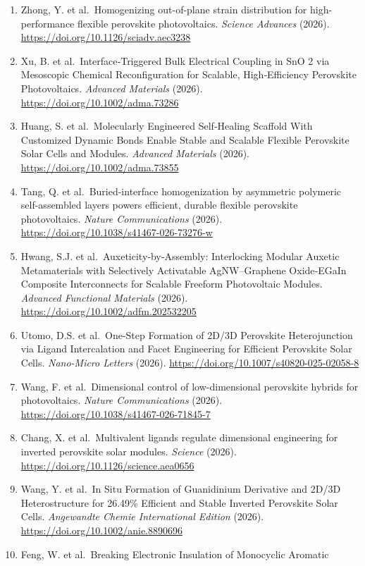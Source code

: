 \documentclass[
  11pt,
]{article}
\begin{document}
\begin{enumerate}
\item
  Zhong, Y. et al.~Homogenizing out-of-plane strain distribution for
  high-performance flexible perovskite photovoltaics. \emph{Science
  Advances} (2026). \url{https://doi.org/10.1126/sciadv.aec3238}
\item
  Xu, B. et al.~Interface‐Triggered Bulk Electrical Coupling in SnO 2
  via Mesoscopic Chemical Reconfiguration for Scalable, High‐Efficiency
  Perovskite Photovoltaics. \emph{Advanced Materials} (2026).
  \url{https://doi.org/10.1002/adma.73286}
\item
  Huang, S. et al.~Molecularly Engineered Self‐Healing Scaffold With
  Customized Dynamic Bonds Enable Stable and Scalable Flexible
  Perovskite Solar Cells and Modules. \emph{Advanced Materials} (2026).
  \url{https://doi.org/10.1002/adma.73855}
\item
  Tang, Q. et al.~Buried-interface homogenization by asymmetric
  polymeric self-assembled layers powers efficient, durable flexible
  perovskite photovoltaics. \emph{Nature Communications} (2026).
  \url{https://doi.org/10.1038/s41467-026-73276-w}
\item
  Hwang, S.J. et al.~Auxeticity‐by‐Assembly: Interlocking Modular
  Auxetic Metamaterials with Selectively Activatable AgNW--Graphene
  Oxide‐EGaIn Composite Interconnects for Scalable Freeform Photovoltaic
  Modules. \emph{Advanced Functional Materials} (2026).
  \url{https://doi.org/10.1002/adfm.202532205}
\item
  Utomo, D.S. et al.~One-Step Formation of 2D/3D Perovskite
  Heterojunction via Ligand Intercalation and Facet Engineering for
  Efficient Perovskite Solar Cells. \emph{Nano-Micro Letters} (2026).
  \url{https://doi.org/10.1007/s40820-025-02058-8}
\item
  Wang, F. et al.~Dimensional control of low-dimensional perovskite
  hybrids for photovoltaics. \emph{Nature Communications} (2026).
  \url{https://doi.org/10.1038/s41467-026-71845-7}
\item
  Chang, X. et al.~Multivalent ligands regulate dimensional engineering
  for inverted perovskite solar modules. \emph{Science} (2026).
  \url{https://doi.org/10.1126/science.aea0656}
\item
  Wang, Y. et al.~In Situ Formation of Guanidinium Derivative and 2D/3D
  Heterostructure for 26.49\% Efficient and Stable Inverted Perovskite
  Solar Cells. \emph{Angewandte Chemie International Edition} (2026).
  \url{https://doi.org/10.1002/anie.8890696}
\item
  Feng, W. et al.~Breaking Electronic Insulation of Monocyclic Aromatic

\end{enumerate}
\end{document}
